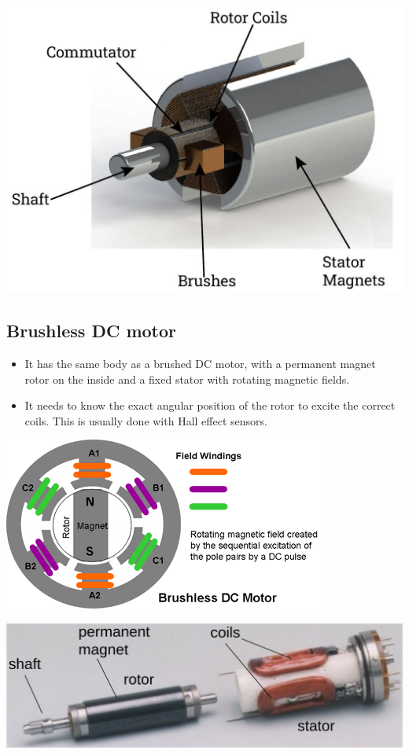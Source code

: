 \documentclass[11pt]{article}
\begin{document}
\begin{center}
\includegraphics[width=.9\linewidth]{./images/brushed-dc-motor.png}
\end{center}

 \newpage
\subsection{Brushless DC motor}
\label{sec:orga4d19d6}
\begin{itemize}
\item It has the same body as a brushed DC motor, with a permanent magnet rotor on the inside and a fixed stator with rotating magnetic fields.
\item It needs to know the exact angular position of the rotor to excite the correct coils. This is usually done with Hall effect sensors.
\end{itemize}

\begin{center}
\includegraphics[width=.9\linewidth]{./images/brushless-dc-motor-diagram.png}
\end{center}
\begin{center}
\includegraphics[width=.9\linewidth]{./images/brushless-dc-motor.png}
\end{center}
\end{document}

